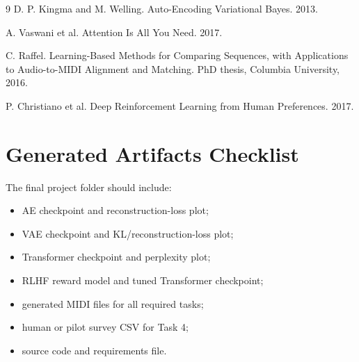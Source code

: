 \documentclass{article}
\begin{document}
\begin{thebibliography}{9}
D. P. Kingma and M. Welling. Auto-Encoding Variational Bayes. 2013.

A. Vaswani et al. Attention Is All You Need. 2017.

C. Raffel. Learning-Based Methods for Comparing Sequences, with Applications to Audio-to-MIDI Alignment and Matching. PhD thesis, Columbia University, 2016.

P. Christiano et al. Deep Reinforcement Learning from Human Preferences. 2017.
\end{thebibliography}

\appendix
\section{Generated Artifacts Checklist}
The final project folder should include:
\begin{itemize}[leftmargin=*]
    \item AE checkpoint and reconstruction-loss plot;
    \item VAE checkpoint and KL/reconstruction-loss plot;
    \item Transformer checkpoint and perplexity plot;
    \item RLHF reward model and tuned Transformer checkpoint;
    \item generated MIDI files for all required tasks;
    \item human or pilot survey CSV for Task 4;
    \item source code and requirements file.
\end{itemize}
\end{document}
